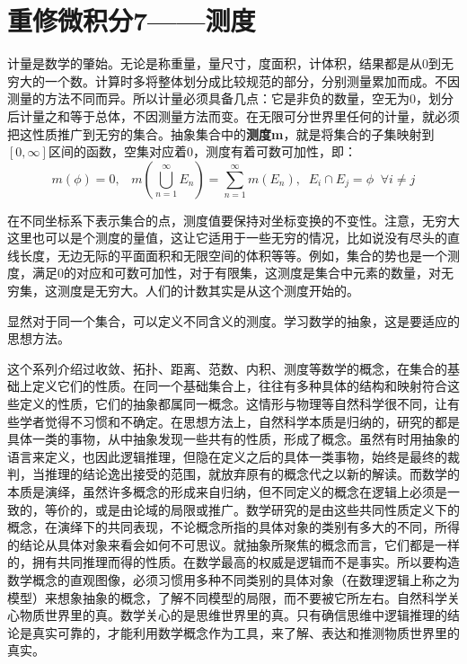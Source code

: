 \section{重修微积分7——测度}

计量是数学的肇始。无论是称重量，量尺寸，度面积，计体积，结果都是从0到无穷大的一个数。计算时多将整体划分成比较规范的部分，分别测量累加而成。不因测量的方法不同而异。所以计量必须具备几点：它是非负的数量，空无为0，划分后计量之和等于总体，不因测量方法而变。在无限可分世界里任何的计量，就必须把这性质推广到无穷的集合。抽象集合中的\textbf{测度m}，就是将集合的子集映射到$ [0,\infty] $区间的函数，空集对应着0，测度有着可数可加性，即：
\begin{equation}
	m(\phi )=0,\;\;\; m(\bigcup_{n=1}^\infty  E_n)=\sum _{n=1}^{\infty} m(E_n),\;\; E_i \cap E_j =\phi\;\;\forall i\neq j
\end{equation}

在不同坐标系下表示集合的点，测度值要保持对坐标变换的不变性。注意，无穷大这里也可以是个测度的量值，这让它适用于一些无穷的情况，比如说没有尽头的直线长度，无边无际的平面面积和无限空间的体积等等。例如，集合的势也是一个测度，满足0的对应和可数可加性，对于有限集，这测度是集合中元素的数量，对无穷集，这测度是无穷大。人们的计数其实是从这个测度开始的。

显然对于同一个集合，可以定义不同含义的测度。学习数学的抽象，这是要适应的思想方法。

这个系列介绍过收敛、拓扑、距离、范数、内积、测度等数学的概念，在集合的基础上定义它们的性质。在同一个基础集合上，往往有多种具体的结构和映射符合这些定义的性质，它们的抽象都属同一概念。这情形与物理等自然科学很不同，让有些学者觉得不习惯和不确定。在思想方法上，自然科学本质是归纳的，研究的都是具体一类的事物，从中抽象发现一些共有的性质，形成了概念。虽然有时用抽象的语言来定义，也因此逻辑推理，但隐在定义之后的具体一类事物，始终是最终的裁判，当推理的结论逸出接受的范围，就放弃原有的概念代之以新的解读。而数学的本质是演绎，虽然许多概念的形成来自归纳，但不同定义的概念在逻辑上必须是一致的，等价的，或是由论域的局限或推广。数学研究的是由这些共同性质定义下的概念，在演绎下的共同表现，不论概念所指的具体对象的类别有多大的不同，所得的结论从具体对象来看会如何不可思议。就抽象所聚焦的概念而言，它们都是一样的，拥有共同推理而得的性质。在数学最高的权威是逻辑而不是事实。所以要构造数学概念的直观图像，必须习惯用多种不同类别的具体对象（在数理逻辑上称之为模型）来想象抽象的概念，了解不同模型的局限，而不要被它所左右。自然科学关心物质世界里的真。数学关心的是思维世界里的真。只有确信思维中逻辑推理的结论是真实可靠的，才能利用数学概念作为工具，来了解、表达和推测物质世界里的真实。

